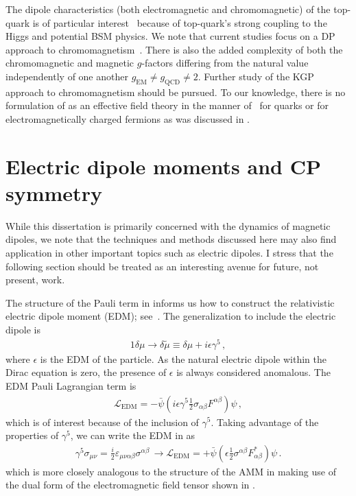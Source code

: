The dipole characteristics (both electromagnetic and chromomagnetic) of the top-quark is of particular interest~\citep{Labun:2012fg,Vryonidou:2018eyv} because of top-quark's strong coupling to the Higgs and potential BSM physics. We note that current studies focus on a DP approach to chromomagnetism~\citep{Zhang:2010dr,Zhang:2012muc,BuarqueFranzosi:2015jrv}. There is also the added complexity of both the chromomagnetic and magnetic $g$-factors differing from the natural value independently of one another $g_\mathrm{EM}\neq g_\mathrm{QCD}\neq2$. Further study of the KGP approach to chromomagnetism should be pursued. To our knowledge, there is no formulation of  as an effective field theory in the manner of~\cite{Fleming:2000ib,Bauer:2000yr} for quarks or for electromagnetically charged fermions as was discussed in .

\section{Electric dipole moments and CP symmetry}
\label{sec:edm}
\noindent While this dissertation is primarily concerned with the dynamics of magnetic dipoles, we note that the techniques and methods discussed here may also find application in other important topics such as electric dipoles. I stress that the following section should be treated as an interesting avenue for future, not present, work.

The structure of the Pauli term in  informs us how to construct the relativistic electric dipole moment (EDM); see~\cite{Knecht:2003kc,Jegerlehner:2017gek}. The generalization to include the electric dipole is
\begin{alignat}{1}
	\label{edm:1} \delta\mu\rightarrow\delta\tilde{\mu}\equiv\delta\mu+i\epsilon\gamma^{5}\,,
\end{alignat}
where $\epsilon$ is the EDM of the particle. As the natural electric dipole within the Dirac equation is zero, the presence of $\epsilon$ is always considered anomalous. The EDM Pauli Lagrangian term is
\begin{gather}
    \label{ledm:1}
    \mathcal{L}_\mathrm{EDM} = -{\bar\psi}\left(i\epsilon\gamma^{5}\frac{1}{2}\sigma_{\alpha\beta}F^{\alpha\beta}\right)\psi\,,
\end{gather}
which is of interest because of the inclusion of $\gamma^{5}$. Taking advantage of the properties of $\gamma^{5}$, we can write the EDM in  as
\begin{gather}
    \label{ledm:3}
    \gamma^{5}\sigma_{\mu\nu}=\frac{i}{2}\varepsilon_{\mu\nu\alpha\beta}\sigma^{\alpha\beta}\,\rightarrow
    \mathcal{L}_\mathrm{EDM} = +{\bar\psi}\left(\epsilon\frac{1}{2}\sigma^{\alpha\beta}F_{\alpha\beta}^{*}\right)\psi\,.
\end{gather}
which is more closely analogous to the structure of the AMM in  making use of the dual form of the electromagnetic field tensor shown in .

